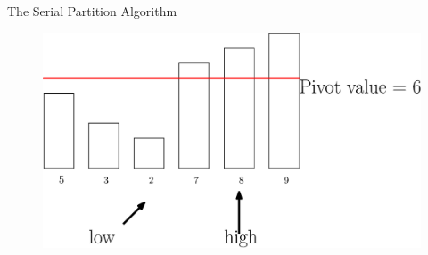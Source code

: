 \documentclass[xcolor=x11names, svgnames, rgb]{beamer}
\begin{document}
\begin{frame}[t]{The Serial Partition Algorithm}
\begin{figure}
\begin{overprint}
		\includegraphics[width=\linewidth]{imgs/serialPartition/serialPartition4.eps}
		\end{overprint}
	\end{figure}	
\end{frame}
\end{document}
